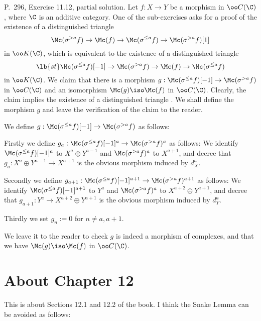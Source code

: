 \documentclass[12pt]{article}
\theoremstyle{remark}
\theoremstyle{definition}
\begin{document}
\begin{s}
P.~296, Exercise 11.12, partial solution. Let $f:X\to Y$ be a morphism in $\oo C(\C)$, where $\C$ is an additive category. One of the sub-exercises asks for a proof of the existence of a distinguished triangle 
$$
\Mc(\sigma^{>a}f)\to\Mc(f)\to\Mc(\sigma^{\le a}f)\to\Mc(\sigma^{>a}f)[1]
$$ 
in $\oo K(\C)$, which is equivalent to the existence of a distinguished triangle 
\begin{equation}\lb{st}
\Mc(\sigma^{\le a}f)[-1]\to\Mc(\sigma^{>a}f)\to\Mc(f)\to\Mc(\sigma^{\le a}f)
\end{equation}
in $\oo K(\C)$. We claim that there is a morphism $g:\Mc(\sigma^{\le a}f)[-1]\to\Mc(\sigma^{>a}f)$ in $\oo C(\C)$ and an isomorphism $\Mc(g)\iso\Mc(f)$ in $\oo C(\C)$. Clearly, the claim implies the existence of a distinguished triangle . We shall define the morphism $g$ and leave the verification of the claim to the reader. 

We define $g:\Mc(\sigma^{\le a}f)[-1]\to\Mc(\sigma^{>a}f)$ as follows:

Firstly we define $g_a:\Mc(\sigma^{\le a}f)[-1]^a\to\Mc(\sigma^{>a}f)^a$ as follows: We identify $\Mc(\sigma^{\le a}f)[-1]^a$ to $X^a\oplus Y^{a-1}$ and $\Mc(\sigma^{>a}f)^a$ to $X^{a+1}$, and decree that $g_a:X^a\oplus Y^{a-1}\to X^{a+1}$ is the obvious morphism induced by $d_X^a$. 

Secondly we define $g_{a+1}:\Mc(\sigma^{\le a}f)[-1]^{a+1}\to\Mc(\sigma^{>a}f)^{a+1}$ as follows: We identify $\Mc(\sigma^{\le a}f)[-1]^{a+1}$ to $Y^a$ and $\Mc(\sigma^{>a}f)^a$ to $X^{a+2}\oplus Y^{a+1}$, and decree that $g_{a+1}:Y^a\to X^{a+2}\oplus Y^{a+1}$ is the obvious morphism induced by $d_Y^a$.

Thirdly we set $g_n:=0$ for $n\neq a,a+1$.

We leave it to the reader to check $g$ is indeed a morphism of complexes, and that we have $\Mc(g)\iso\Mc(f)$ in $\oo C(\C)$.
\end{s}


\section{About Chapter 12}

  

This is about Sections 12.1 and 12.2 of the book. I think the Snake Lemma can be avoided as follows: 
\end{document}
